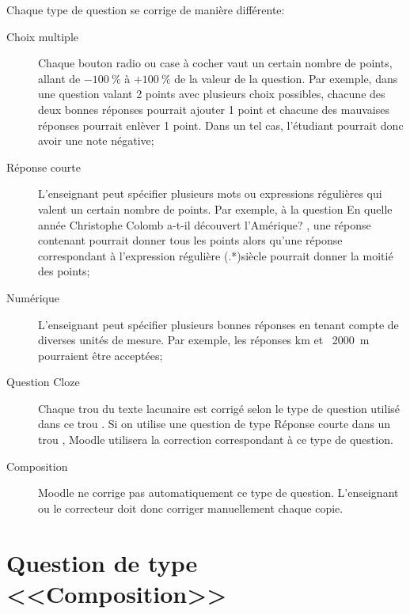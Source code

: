 \begin{minipage}{\linewidth}
Chaque type de question se corrige de mani\`ere diff\'erente:
\begin{description}
  \item[Choix multiple]
  
  Chaque bouton radio ou case \`a cocher vaut un certain nombre de points, allant de $-100~\%$ \`a $+100~\%$ de la valeur de la question.
  Par exemple, dans une question valant 2 points avec plusieurs choix possibles, chacune des deux bonnes r\'eponses pourrait ajouter 1 point et chacune des mauvaises r\'eponses pourrait enl\`ever 1 point.
  Dans un tel cas, l'\'etudiant pourrait donc avoir une note n\'egative;
  
  \item[R\'eponse courte]
  
  L'enseignant peut sp\'ecifier plusieurs mots ou expressions r\'eguli\`eres qui valent un certain nombre de points. Par exemple,
  \`a la question \og{} En quelle ann\'ee Christophe Colomb a-t-il d\'ecouvert l'Am\'erique? \fg{}, une r\'eponse contenant  \fg{} pourrait donner tous les points alors qu'une r\'eponse correspondant \`a l'expression r\'eguli\`ere (.*)si\`ecle \fg{} pourrait donner la moiti\'e des points;
  
  \item[Num\'erique]
  
  L'enseignant peut sp\'ecifier plusieurs bonnes r\'eponses en tenant compte de diverses unit\'es de mesure.
  Par exemple, les r\'eponses  km \fg{} et  \og~2000~m~\fg{} pourraient \^etre accept\'ees;
  
  \item[Question Cloze]
  
  Chaque \og trou \fg{} du texte lacunaire est corrig\'e selon le type de question utilis\'e dans ce \og trou \fg{}.
  Si on utilise une question de type R\'eponse courte dans un \og trou \fg{}, Moodle utilisera la correction correspondant \`a ce type de question.
  
  \item[Composition]
  
  Moodle ne corrige pas automatiquement ce type de question.
  L'enseignant ou le correcteur doit donc corriger manuellement chaque copie.
\end{description}
\end{minipage}

\section{Question de type <<Composition>>}

